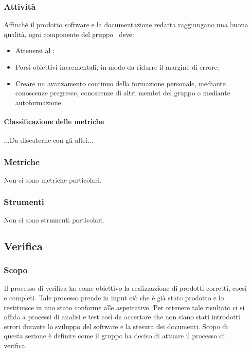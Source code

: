 \subsubsection{Attività}
Affinché il prodotto software e la documentazione redatta raggiungano una buona qualità, ogni componente del gruppo \groupName\ deve:
\begin{itemize}
    \item Attenersi al \docNamePdQLow;
    \item Porsi obiettivi incrementali, in modo da ridurre il margine di errore;
    \item Creare un avanzamento continuo della formazione personale, mediante conoscenze pregresse, conoscenze di altri membri del gruppo o mediante autoformazione. 
 \end {itemize}   
\paragraph{Classificazione delle metriche}
...Da discuterne con gli altri...
\subsubsection{Metriche}
Non ci sono metriche particolari.
\subsubsection{Strumenti}
Non ci sono strumenti particolari.

\pagebreak

\subsection{Verifica} \label{subsection: Verifica}
    \subsubsection{Scopo}
    Il processo di verifica ha come obiettivo la realizzazione di prodotti corretti, coesi e completi. Tale processo prende in input ciò che è già stato prodotto e lo restituisce in uno stato conforme alle aspettative. Per ottenere tale risultato ci si affida a processi di analisi e test così da accertare che non siano stati introdotti errori durante lo sviluppo del software e la stesura dei documenti. Scopo di questa sezione è definire come il gruppo ha deciso di attuare il processo di verifica.

